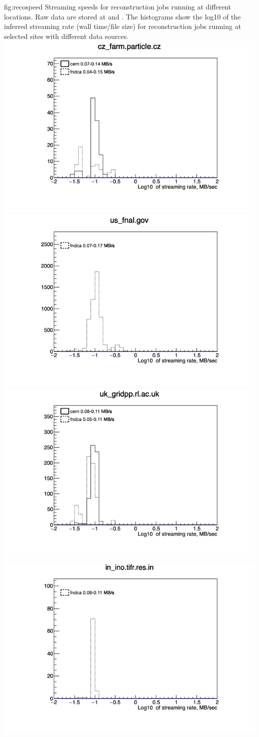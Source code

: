 \documentclass[../main-v1.tex]{subfiles}
\begin{document}
{\begin{dunefigure}
{fig:recospeed} 
{Streaming speeds for reconstruction jobs running at different locations. Raw data are stored at  and .  The histograms show the log10 of the inferred streaming rate (wall time/file size) for reconstruction jobs running at selected sites with different data sources.}
\includegraphics[width=0.45 \textwidth]{graphics/Workflow/dune_slow_2021_01_01_2021_04_30_0_cz_farm.particle.cz.png}
\includegraphics[width=0.45 \textwidth]{graphics/Workflow/dune_slow_2021_01_01_2021_04_30_0_us_fnal.gov.png}
\includegraphics[width=0.45 \textwidth]{graphics/Workflow/dune_slow_2021_01_01_2021_04_30_0_uk_gridpp.rl.ac.uk.png}
\includegraphics[width=0.45 \textwidth]{graphics/Workflow/dune_slow_2021_01_01_2021_04_30_0_in_ino.tifr.res.in.png}
\end{dunefigure}


}
\end{document}
